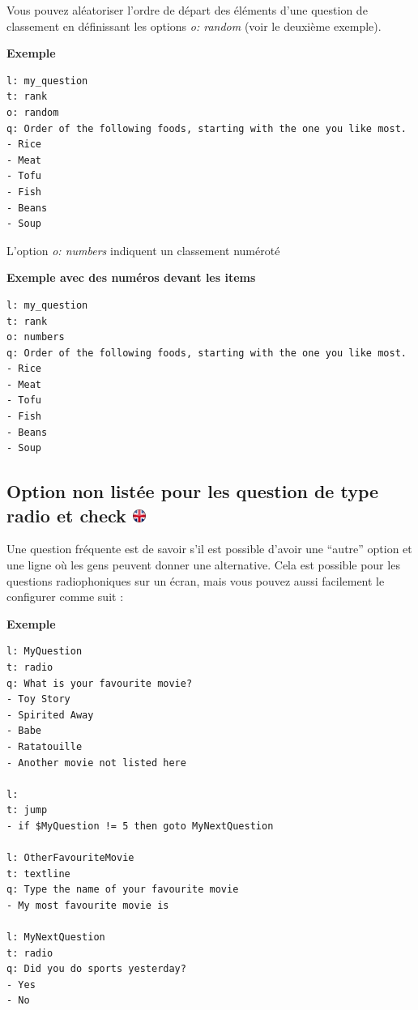 \documentclass[
]{book}
\begin{document}
Vous pouvez aléatoriser l'ordre de départ des éléments d'une question de classement en définissant les options \emph{o: random} (voir le deuxième exemple).

\textbf{Exemple}

\begin{verbatim}
l: my_question
t: rank
o: random
q: Order of the following foods, starting with the one you like most.
- Rice
- Meat
- Tofu
- Fish
- Beans
- Soup
\end{verbatim}

L'option \emph{o: numbers} indiquent un classement numéroté

\textbf{Exemple avec des numéros devant les items}

\begin{verbatim}
l: my_question
t: rank
o: numbers
q: Order of the following foods, starting with the one you like most.
- Rice
- Meat
- Tofu
- Fish
- Beans
- Soup
\end{verbatim}

\hypertarget{option-non-listuxe9e-pour-les-question-de-type-radio-et-check}{%
\subsection[Option non listée pour les question de type radio et check ]{\texorpdfstring{Option non listée pour les question de type radio et check \href{https://www.psytoolkit.org/doc3.4.0/online-survey-syntax.html\#others}{\protect\includegraphics{img/ukflag.png}}}{Option non listée pour les question de type radio et check }}\label{option-non-listuxe9e-pour-les-question-de-type-radio-et-check}}

Une question fréquente est de savoir s'il est possible d'avoir une ``autre'' option et une ligne où les gens peuvent donner une alternative. Cela est possible pour les questions radiophoniques sur un écran, mais vous pouvez aussi facilement le configurer comme suit :

\textbf{Exemple}

\begin{verbatim}
l: MyQuestion
t: radio
q: What is your favourite movie?
- Toy Story
- Spirited Away
- Babe
- Ratatouille
- Another movie not listed here

l:
t: jump
- if $MyQuestion != 5 then goto MyNextQuestion

l: OtherFavouriteMovie
t: textline
q: Type the name of your favourite movie
- My most favourite movie is

l: MyNextQuestion
t: radio
q: Did you do sports yesterday?
- Yes
- No
\end{verbatim}
\end{document}

